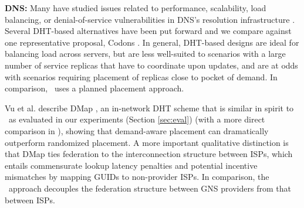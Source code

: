 
{\bf{DNS:}} Many have studied issues related to performance, scalability, load balancing, or denial-of-service vulnerabilities in DNS's resolution infrastructure \cite{Pappas,codons-paper,Brownlee,dnssec}. Several DHT-based alternatives have been put forward \cite{codons-paper,cox,DHTdns} and we compare against one representative proposal, Codons \cite{codons-paper}. In general, DHT-based designs are ideal for balancing load across servers, but are less well-suited to scenarios with a large number of service replicas that have to coordinate upon updates, and are at odds with scenarios requiring placement of replicas close to pocket of demand. In comparison, \auspice\ uses a planned placement approach.

Vu et al. describe DMap \cite{VuICDCS12}, an in-network DHT scheme %
that is similar in spirit to \staticthree\ as evaluated in our experiments (Section \ref{sec:eval}) (with a more direct comparison in \cite{techreport}), showing that demand-aware placement can dramatically outperform randomized placement. A more important qualitative distinction is that DMap ties federation to the interconnection structure between ISPs, which entails commensurate lookup latency penalties and potential incentive mismatches by mapping GUIDs to non-provider ISPs. In comparison, the \auspice\ approach decouples the federation structure between GNS providers from that between ISPs.



